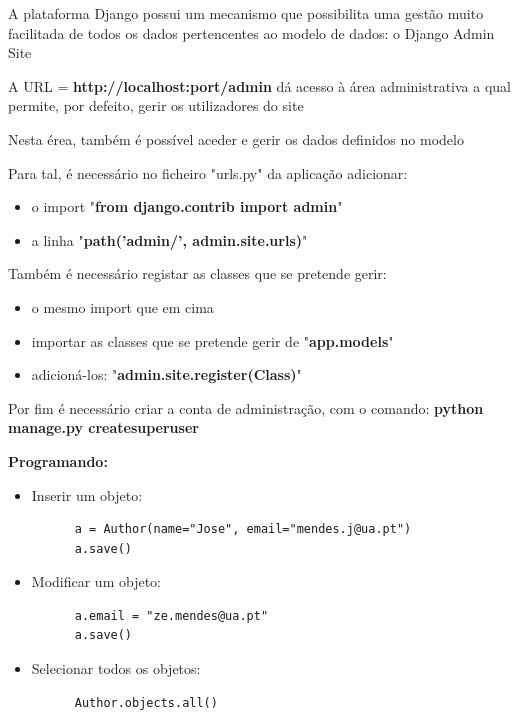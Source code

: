 \documentclass{article}
\begin{document}
\begin{flushleft}
  A plataforma Django possui um mecanismo
  que possibilita uma gestão muito facilitada de
  todos os dados pertencentes ao modelo de
  dados: o Django Admin Site

  A URL = \textbf{http://localhost:{port}/admin} dá acesso
  à área administrativa a qual permite, por
  defeito, gerir os utilizadores do site

  Nesta érea, também é possível aceder e gerir
  os dados definidos no modelo

  Para tal, é necessário no ficheiro "urls.py" da
  aplicação adicionar:
  \begin{itemize}
    \item o import "\textbf{from django.contrib import admin}"
    \item a linha "\textbf{path('admin/', admin.site.urls)}"
  \end{itemize}

  Também é necessário registar as classes que se pretende gerir:
  \begin{itemize}
    \item o mesmo import que em cima
    \item importar as classes que se pretende gerir de "\textbf{app.models}"
    \item adicioná-los: "\textbf{admin.site.register(Class)}"
  \end{itemize}

  Por fim é necessário criar a conta de administração, com o comando:
  \textbf{python manage.py createsuperuser}

  \vspace{2mm}

  \textbf{Programando:}
  \begin{itemize}
    \item Inserir um objeto:
    \begin{lstlisting}
      a = Author(name="Jose", email="mendes.j@ua.pt")
      a.save()
    \end{lstlisting}

    \item Modificar um objeto:
    \begin{lstlisting}
      a.email = "ze.mendes@ua.pt"
      a.save()
    \end{lstlisting}

    \item Selecionar todos os objetos:
    \begin{lstlisting}
      Author.objects.all()
    \end{lstlisting}


\end{itemize}
\end{flushleft}
\end{document}

